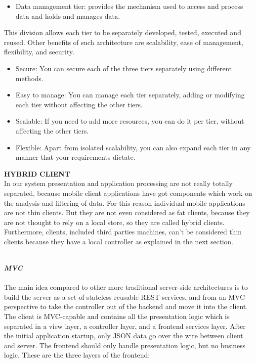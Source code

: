 \begin{legal}
\begin{legal}
\begin{itemize}
					\item Data management tier: provides the mechanism used to access and process data and holds and manages data.
				\end{itemize}
				 This division allows each tier to be separately developed, tested, executed and reused. Other benefits of such architecture are scalability, ease of management, flexibility, and security.
				\begin{itemize}
					\item Secure: You can secure each of the three tiers separately using different methods.
					\item Easy to manage: You can manage each tier separately, adding or modifying each tier without affecting the other tiers.
					\item Scalable: If you need to add more resources, you can do it per tier, without affecting the other tiers.
					\item Flexible: Apart from isolated scalability, you can also expand each tier in any manner that your requirements dictate.\\
				\end{itemize}
				\textbf{HYBRID CLIENT}\\
				In our system presentation and application processing are not really totally separated, because mobile client applications have got components which work on the analysis and filtering of data. For this reason individual mobile applications are not thin clients. But they are not even considered as fat clients, because they are not thought to rely on a local store, so they are called hybrid clients. Furthermore, clients, included third parties machines, can't be considered thin clients because they have a local controller as explained in the next section.\\\\
				\item \textit{\textbf{MVC}}\\\\
				The main idea compared to other more traditional server-side architectures is to build the server as a set of stateless reusable REST services, and from an MVC perspective to take the controller out of the backend and move it into the client.
				The client is MVC-capable and contains all the presentation logic which is separated in a view layer, a controller layer, and a frontend services layer. After the initial application startup, only JSON data go over the wire between client and server.
				The frontend should only handle presentation logic, but no business logic. These are the three layers of the frontend:

\end{legal}
\end{legal}
